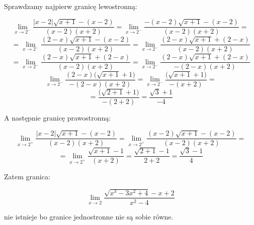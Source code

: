 \documentclass{article}
\begin{document}
Sprawdzamy najpierw granicę lewostronną:

\begin{equation*}
    \lim_{x \to 2^-} \frac{|x-2|\sqrt{x+1} - (x - 2)}{(x -2)(x+2)} = \lim_{x \to 2^-} \frac{-(x - 2)\sqrt{x+1} - (x - 2)}{(x -2)(x+2)} = 
\end{equation*}
\begin{equation*}
    = \lim_{x \to 2^-} \frac{(2 - x)\sqrt{x+1} - (x - 2)}{(x -2)(x+2)} = \lim_{x \to 2^-} \frac{(2 - x)\sqrt{x+1} + (2 - x)}{(x -2)(x+2)}
\end{equation*}
\begin{equation*}
    = \lim_{x \to 2^-} \frac{(2 - x)\sqrt{x+1} + (2 - x)}{(x -2)(x+2)} = \lim_{x \to 2^-} \frac{(2 - x)\sqrt{x+1} + (2 - x)}{-(2 - x)(x+2)}
\end{equation*}
\begin{equation*}
    \lim_{x \to 2^-} \frac{(2 - x)\Big(\sqrt{x+1} + 1 \Big)}{-(2 - x)(x+2)} = \lim_{x \to 2^-} \frac{\Big(\sqrt{x+1} + 1 \Big)}{-(x+2)} = 
\end{equation*}
\begin{equation*}
    = \frac{\Big(\sqrt{2+1} + 1 \Big)}{-(2+2)} = \frac{\sqrt{3} + 1}{-4}
\end{equation*}

A następnie granicę prawostronną:

\begin{equation*}
    \lim_{x \to 2^+} \frac{|x-2|\sqrt{x+1} - (x - 2)}{(x -2)(x+2)} = \lim_{x \to 2^+} \frac{(x-2)\sqrt{x+1} - (x - 2)}{(x -2)(x+2)} = 
\end{equation*}
\begin{equation*}
    = \lim_{x \to 2^+} \frac{\sqrt{x+1} - 1}{(x + 2)} = \frac{\sqrt{2 + 1} -1}{2 + 2} = \frac{\sqrt{3} - 1}{4}
\end{equation*}

Zatem granica:

\begin{equation*}
    \lim_{x \to 2} \frac{\sqrt{x^3 - 3x^2 +4} -x + 2}{x^2 - 4} 
\end{equation*}

nie istnieje bo granice jednostronne nie są sobie równe.
\end{document}
